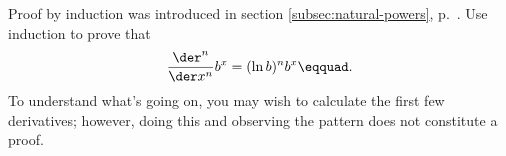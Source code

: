 Proof by induction was introduced in section \ref{subsec:natural-powers}, p.~\pageref{induction}.
Use induction to prove that
\begin{equation*}
  \frac{\der^n}{\der x^n} b^x = (\ln b)^n b^x\eqquad.
\end{equation*}
To understand what's going on, you may wish to calculate the first few derivatives; however,
doing this and observing the pattern does not constitute a proof.
